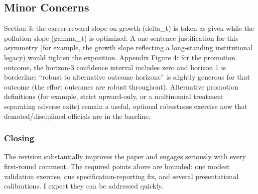 \documentclass[
  11pt,
]{article}
\begin{document}
\subsection{Minor Concerns}\label{minor-concerns}

Section 3: the career-reward slope on growth (delta\_t) is taken as
given while the pollution slope (gamma\_t) is optimized. A one-sentence
justification for this asymmetry (for example, the growth slope
reflecting a long-standing institutional legacy) would tighten the
exposition. Appendix Figure 4: for the promotion outcome, the horizon-3
confidence interval includes zero and horizon 1 is borderline; ``robust
to alternative outcome horizons'' is slightly generous for that outcome
(the effort outcomes are robust throughout). Alternative promotion
definitions (for example, strict upward-only, or a multinomial treatment
separating adverse exits) remain a useful, optional robustness exercise
now that demoted/disciplined officials are in the baseline.

\subsubsection{Closing}\label{closing}

The revision substantially improves the paper and engages seriously with
every first-round comment. The required points above are bounded: one
modest validation exercise, one specification-reporting fix, and several
presentational calibrations. I expect they can be addressed quickly.
\end{document}
